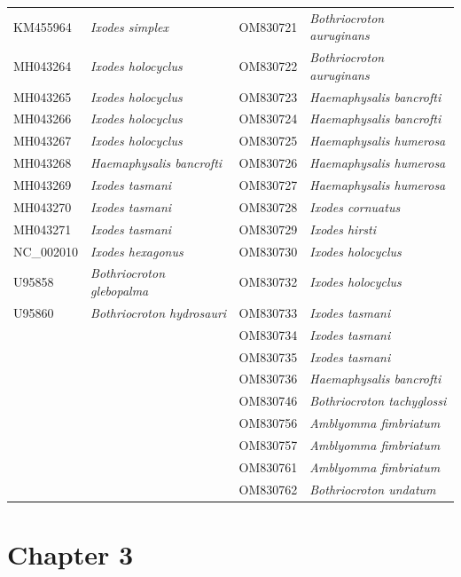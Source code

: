 \documentclass[a4paper, nobind]{templates/ociamthesis}
\begin{document}
\begin{longtable}[t]{l>{}l|l>{}l}
KM455964 & \em{Ixodes simplex} & OM830721 & \em{Bothriocroton auruginans}\\
MH043264 & \em{Ixodes holocyclus} & OM830722 & \em{Bothriocroton auruginans}\\
MH043265 & \em{Ixodes holocyclus} & OM830723 & \em{Haemaphysalis bancrofti}\\
MH043266 & \em{Ixodes holocyclus} & OM830724 & \em{Haemaphysalis bancrofti}\\
MH043267 & \em{Ixodes holocyclus} & OM830725 & \em{Haemaphysalis humerosa}\\
MH043268 & \em{Haemaphysalis bancrofti} & OM830726 & \em{Haemaphysalis humerosa}\\
MH043269 & \em{Ixodes tasmani} & OM830727 & \em{Haemaphysalis humerosa}\\
MH043270 & \em{Ixodes tasmani} & OM830728 & \em{Ixodes cornuatus}\\
MH043271 & \em{Ixodes tasmani} & OM830729 & \em{Ixodes hirsti}\\
NC\_002010 & \em{Ixodes hexagonus} & OM830730 & \em{Ixodes holocyclus}\\
U95858 & \em{Bothriocroton glebopalma} & OM830732 & \em{Ixodes holocyclus}\\
U95860 & \em{Bothriocroton hydrosauri} & OM830733 & \em{Ixodes tasmani}\\
 & \em{} & OM830734 & \em{Ixodes tasmani}\\
 & \em{} & OM830735 & \em{Ixodes tasmani}\\
 & \em{} & OM830736 & \em{Haemaphysalis bancrofti}\\
 & \em{} & OM830746 & \em{Bothriocroton tachyglossi}\\
 & \em{} & OM830756 & \em{Amblyomma fimbriatum}\\
 & \em{} & OM830757 & \em{Amblyomma fimbriatum}\\
 & \em{} & OM830761 & \em{Amblyomma fimbriatum}\\
 & \em{} & OM830762 & \em{Bothriocroton undatum}\\*
\end{longtable}
\endgroup{}

\newpage

\hypertarget{ch3supp}{%
\section{Chapter 3}\label{ch3supp}}
\end{document}

